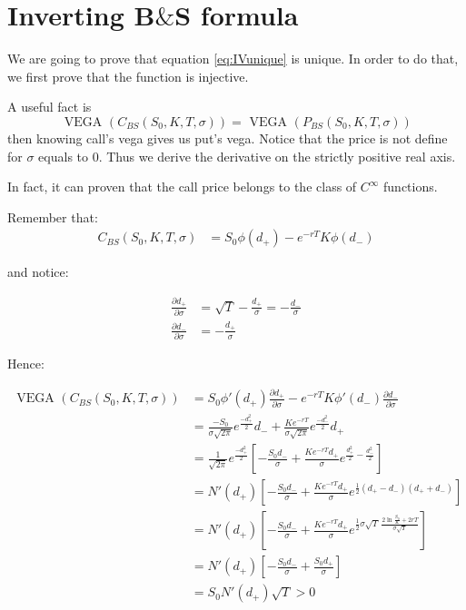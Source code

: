 \section{Inverting B$\&$S formula}
\label{anx:invert_BS}

We are going to prove that equation \ref{eq:IVunique} is unique. In order to do that, we first prove that the function is injective.

A useful fact is 
$$\text{ VEGA } (C_{BS}( S_0, K, T, \sigma )) = \text{ VEGA } (P_{BS}( S_0, K, T, \sigma )) $$ then knowing call's vega gives us put's vega. Notice that the price is not define for $\sigma$ equals to $0$. Thus we derive the derivative on the strictly positive real axis. 


In fact, it can proven that the call price belongs to the class of $C^{\infty}$ functions.


Remember that:
\begin{align*}
C_{BS}( S_0, K, T, \sigma ) &= S_0 \phi ( d_+ ) - e^{-r T } K  \phi( d_- ) 
\end{align*}

and notice:

\begin{align*}
\frac{\partial d_+ }{\partial \sigma }  &= \sqrt T - \frac {d_+} {\sigma} = - \frac {d_-} {\sigma} \\
\frac{\partial d_- }{\partial \sigma }  &= - \frac {d_+} {\sigma} 
\end{align*}

Hence: 

\begin{align*}
\text{ VEGA } (C_{BS}( S_0, K, T, \sigma )) 
&= S_0 \phi' ( d_+ ) \frac{\partial d_+ }{\partial \sigma } 
- e^{-r T } K  \phi'( d_- ) \frac{\partial d_- }{\partial \sigma } \\ 
&= \frac{-S_0}{\sigma \sqrt{2\pi}}{e^\frac{-d_+^2}{2}} d_-
+ \frac{Ke^{-rT}}{\sigma \sqrt{2\pi}}e^{\frac{-d_-^2}{2}} d_+ 
\\
&=\frac{1}{\sqrt{2\pi}}e^{\frac{-d_+^2}{2}}\left[-\frac{S_0 d_-}{\sigma} + \frac{Ke^{-rT}d_+}{\sigma} e^{\frac{d_+^2}{2} - \frac{d_-^2}{2}} \right]\\
&=N'(d_+)\left[-\frac{S_0 d_-}{\sigma} + \frac{Ke^{-rT}d_+}{\sigma} e^{\frac{1}{2}(d_+-d_-)(d_++d_-)} \right]\\
&=N'(d_+)\left[-\frac{S_0 d_-}{\sigma} + \frac{Ke^{-rT}d_+}{\sigma} e^{\frac{1}{2}\sigma \sqrt{T}\, \frac{2\ln \frac{S_0}{K} +2rT}{\sigma \sqrt{T}}} \right]\\
&=N'(d_+)\left[-\frac{S_0 d_-}{\sigma} + \frac{S_0d_+}{\sigma} \right]\\
&=S_0 N'(d_+)\sqrt{T} > 0
\end{align*}

